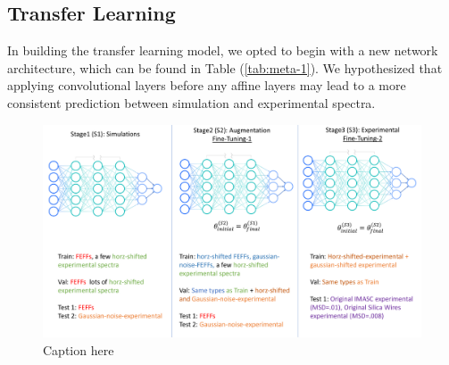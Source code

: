\subsection{Transfer Learning}
In building the transfer learning model, we opted to begin with a new network architecture, which can be found in Table (\ref{tab:meta-1}). We hypothesized that applying convolutional layers before any affine layers may lead to a more consistent prediction between simulation and experimental spectra.

\begin{figure}
    \centering
    \includegraphics[width=\linewidth]{Chapters/Figures/transfer-learning-breakdown.pdf}
    \caption[Transfer Learning Process]{Caption here}
    \label{fig:transfer-learning-databreakdown}
\end{figure}

